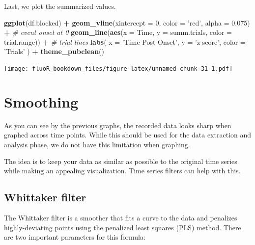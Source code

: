 \documentclass[
]{book}
\newenvironment{Shaded}{\begin{snugshade}}{\end{snugshade}}
\newcommand{\CommentTok}[1]{\textcolor[rgb]{0.56,0.35,0.01}{\textit{#1}}}
\newcommand{\DataTypeTok}[1]{\textcolor[rgb]{0.13,0.29,0.53}{#1}}
\newcommand{\DecValTok}[1]{\textcolor[rgb]{0.00,0.00,0.81}{#1}}
\newcommand{\FloatTok}[1]{\textcolor[rgb]{0.00,0.00,0.81}{#1}}
\newcommand{\KeywordTok}[1]{\textcolor[rgb]{0.13,0.29,0.53}{\textbf{#1}}}
\newcommand{\NormalTok}[1]{#1}
\newcommand{\OperatorTok}[1]{\textcolor[rgb]{0.81,0.36,0.00}{\textbf{#1}}}
\newcommand{\StringTok}[1]{\textcolor[rgb]{0.31,0.60,0.02}{#1}}
\begin{document}
Last, we plot the summarized values.

\begin{Shaded}
\begin{Highlighting}[]
\KeywordTok{ggplot}\NormalTok{(df.blocked) }\OperatorTok{+}
\StringTok{  }\KeywordTok{geom_vline}\NormalTok{(}\DataTypeTok{xintercept =} \DecValTok{0}\NormalTok{,}
             \DataTypeTok{color =} \StringTok{'red'}\NormalTok{, }\DataTypeTok{alpha =} \FloatTok{0.075}\NormalTok{) }\OperatorTok{+}\StringTok{ }\CommentTok{# event onset at 0}
\StringTok{  }\KeywordTok{geom_line}\NormalTok{(}\KeywordTok{aes}\NormalTok{(}\DataTypeTok{x =}\NormalTok{ Time, }\DataTypeTok{y =}\NormalTok{ summ.trials,}
                \DataTypeTok{color =}\NormalTok{ trial.range)) }\OperatorTok{+}\StringTok{ }\CommentTok{# trial lines}
\StringTok{  }\KeywordTok{labs}\NormalTok{(}
    \DataTypeTok{x =} \StringTok{'Time Post-Onset'}\NormalTok{,}
    \DataTypeTok{y =} \StringTok{'z score'}\NormalTok{,}
    \DataTypeTok{color =} \StringTok{'Trials'}
\NormalTok{  ) }\OperatorTok{+}
\StringTok{  }\KeywordTok{theme_pubclean}\NormalTok{()}
\end{Highlighting}
\end{Shaded}

\texttt{[image: fluoR\_bookdown\_files/figure-latex/unnamed-chunk-31-1.pdf]}

\hypertarget{vis-smoothing}{%
\section{Smoothing}\label{vis-smoothing}}

As you can see by the previous graphs, the recorded data looks sharp when graphed across time points. While this should be used for the data extraction and analysis phase, we do not have this limitation when graphing.

The idea is to keep your data as similar as possible to the original time series while making an appealing visualization. Time series filters can help with this.

\hypertarget{vis-smoothing-whittaker}{%
\subsection{Whittaker filter}\label{vis-smoothing-whittaker}}

The Whittaker filter is a smoother that fits a curve to the data and penalizes highly-deviating points using the penalized least squares (PLS) method. There are two important parameters for this formula:
\end{document}
